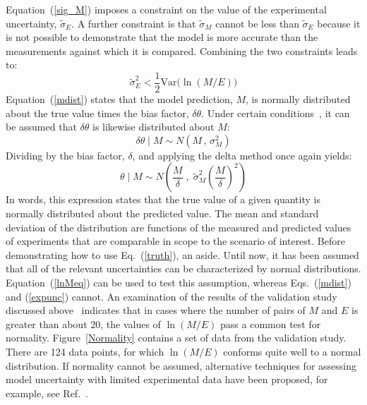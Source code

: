 \documentclass[fleqn,b5paper]{article}
\begin{document}
Equation~(\ref{sig_M}) imposes a constraint on the value of the experimental uncertainty, $\widetilde{\sigma}_E$. A further constraint is that $\widetilde{\sigma}_M$ cannot be less than $\widetilde{\sigma}_E$ because it is not possible to demonstrate that the model is more accurate than the measurements against which it is compared. Combining the two constraints leads to:
\begin{equation}
   \widetilde{\sigma}_E^2 < \frac{1}{2} \mathrm{Var}\Big( \ln (M/E) \Big)
\end{equation}
Equation~(\ref{mdist}) states that the model prediction, $M$, is normally distributed about the true value times the bias factor, $\delta \theta$. Under certain conditions~\cite{McGrattan:Metrologia}, it can be assumed that $\delta \theta$ is likewise distributed about $M$:
\begin{equation}
   \delta \theta \; | \; M \sim N \left(M \, , \, \sigma_M^2 \right) \label{thetaeq}
\end{equation}
Dividing by the bias factor, $\delta$, and applying the delta method once again yields:
\begin{equation}
   \theta \; | \; M \sim N \left( \frac{M}{\delta} \; , \; \widetilde{\sigma}_M^2 \left( \frac{M}{\delta} \right)^2 \right) \label{truth}
\end{equation}
In words, this expression states that the true value of a given quantity is normally distributed about the predicted value. The mean and standard deviation of the distribution are functions of the measured and predicted values of experiments that are comparable in scope to the scenario of interest. Before demonstrating how to use Eq.~(\ref{truth}), an aside. Until now, it has been assumed that all of the relevant uncertainties can be characterized by normal distributions. Equation~(\ref{lnMeq}) can be used to test this assumption, whereas Eqs.~(\ref{mdist}) and (\ref{expunc}) cannot. An examination of the results of the validation study discussed above~\cite{NUREG_1824} indicates that in cases where the number of pairs of $M$ and $E$ is greater than about 20, the values of $\ln (M/E)$ pass a common test for normality. Figure~\ref{Normality} contains a set of data from the validation study. There are 124 data points, for which $\ln (M/E)$ conforms quite well to a normal distribution. If normality cannot be assumed, alternative techniques for assessing model uncertainty with limited experimental data have been proposed, for example, see Ref.~\cite{Siu:1992}.
\end{document}
